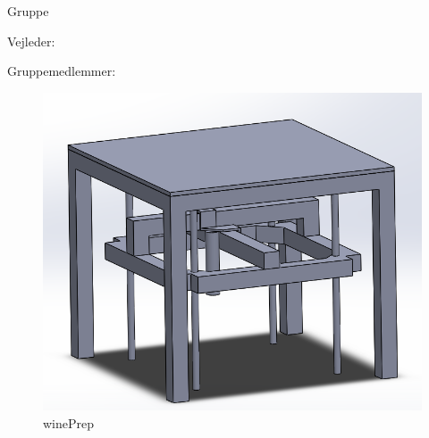 \begin{titlingpage}
	\center
	\HUGE\thetitle
	
	
	\LARGE\ShowProject
	
	\Large Gruppe \ShowGroupNumber
	
	
	
	\normalsize Vejleder: \ShowVejleder
	
	Gruppemedlemmer:
	
	\PrintGroupMembers
\end{titlingpage}

\begin{figure}[H]
	\centerline{\includegraphics[scale=0.07]{winePrep}}
	\caption{winePrep}
\end{figure}